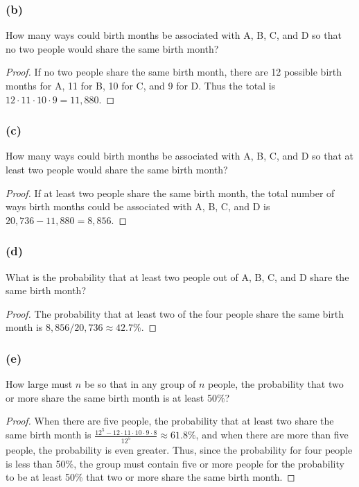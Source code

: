 \documentclass[14pt]{extarticle}
\begin{document}
\subsubsection{(b)}
How many ways could birth months be associated with A, B, C, and D so that no two people would share the same birth 
month?

\begin{proof}
If no two people share the same birth month, there are 12 possible birth months for A, 11 for B, 10 for C, and 9 for 
D. Thus the total is \(12 \cdot 11 \cdot 10 \cdot 9 = 11,880\).
\end{proof}

\subsubsection{(c)}
How many ways could birth months be associated with A, B, C, and D so that at least two people would share the same 
birth month?

\begin{proof}
If at least two people share the same birth month, the total number of ways birth months could be associated with A, B, C, and D is \(20,736 - 11,880 = 8,856\).
\end{proof}

\subsubsection{(d)}
What is the probability that at least two people out of A, B, C, and D share the same birth month?

\begin{proof}
The probability that at least two of the four people share the same birth month is \(8,856 / 20,736 \approx 42.7\%\).
\end{proof}

\subsubsection{(e)}
How large must $n$ be so that in any group of $n$ people, the probability that two or more share the same birth month 
is at least 50\%?

\begin{proof}
When there are five people, the probability that at least two share the same birth month is \(\frac{12^5 - 12 \cdot 
11 \cdot 10 \cdot 9 \cdot 8}{12^5} \approx 61.8\%\), and when there are more than five people, the probability is 
even greater. Thus, since the probability for four people is less than 50\%, the group must contain five or more 
people for the probability to be at least 50\% that two or more share the same birth month. 
\end{proof}
\end{document}
